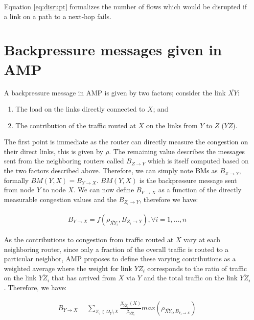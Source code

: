 Equation \ref{eq:disrupt} formalizes the number of flows which would be disrupted if a link on a path to a next-hop fails. 


\section{Backpressure messages given in AMP}
\label{sect:AMPCALC}

A backpressure message in AMP is given by two factors; consider the link $\overline{XY}$:

\begin{enumerate}
\item The load on the links directly connected to $X$; and
\item The contribution of the traffic routed at $X$ on the links from $Y$ to $Z$ ($\overline{YZ}$).
\end{enumerate}

The first point is immediate as the router can directly measure the congestion on their direct links, this is given by $\rho$. The remaining value describes the messages sent from the neighboring routers called $B_{Z\rightarrow Y}$ which is itself computed based on the two factors described above. Therefore, we can simply note BMs as $B_{Z\rightarrow Y}$, formally $BM(Y,X) = B_{Y\rightarrow X}$. $BM(Y,X)$ is the backpressure message sent from node $Y$ to node $X$. We can now define $ B_{Y\rightarrow X}$ as a function of the directly measurable congestion values and the $B_{Z_{i} \rightarrow Y}$, therefore we have:

 \begin{align}
B_{Y\rightarrow X} = f(\rho_{\overline{XY}_i}, B_{Z_{i} \rightarrow Y}), \forall i = 1, \dots, n
 \label{eq:BM1}
\end{align}

As the contributions to congestion from traffic routed at $X$ vary at each neighboring router, since only a fraction of the overall traffic is routed to a particular neighbor, AMP proposes to define these varying contributions as a weighted average where the weight for link $\overline{YZ_{i}}$ corresponds to the ratio of traffic on the link $\overline{YZ_{i}}$ that has arrived from $X$ via $Y$ and the total traffic on the link $\overline{YZ_{i}}$. Therefore, we have:

\begin{align}
B_{Y\rightarrow X} = \displaystyle\sum\limits_{Z_{i} \in \Omega_{Y} \setminus X}\frac{\beta_{ \overline{ YZ_{ i } } } (X) } { \beta_{\overline{YZ_{i}}}} max(\rho_{\overline{XY}_i, B_{Y_{i} \rightarrow X}})
 \label{eq:BM2}
\end{align}

